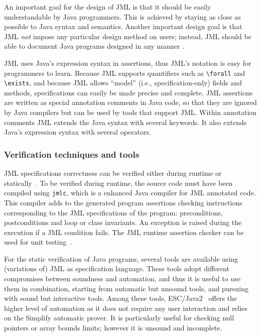 An important goal for the design of JML is that it should be easily
understandable by Java programmers. This is achieved by staying as
close as possible to Java syntax and semantics.  Another important
design goal is that JML {\em not} impose any particular design method
on users; instead, JML should be able to document Java programs
designed in any manner \cite{Leavens-Baker-Ruby03}.

JML uses Java's expression syntax in assertions,
thus JML's notation is easy for programmers to learn.  
Because JML supports quantifiers such as
\verb_\forall_ and \verb_\exists_, and because JML allows ``model''
(i.e., specification-only) fields and methods, specifications can
easily be made precise and complete.
JML assertions are written as special
annotation comments in Java code,
so that they are ignored by Java compilers but can be used
by tools that support JML\@.  Within annotation comments JML extends the
Java syntax with several keywords.  It also extends Java's expression syntax with several
operators.

\subsubsection{Verification techniques and tools}

JML specifications correctness can be verified either during runtime
or statically~\cite{BurdyCCEKLLP03}. To be verified during runtime, the
source code must have been compiled using \texttt{jmlc}, which is a
enhanced Java compiler for JML annotated code. This compiler adds to
the generated program assertions checking instructions corresponding
to the JML specifications of the program: preconditions, postconditions 
and loop or class invariants. An exception is raised during the execution 
if a JML condition fails. The JML runtime assertion checker can be used
for unit testing~\cite{CL02:ecoop}.


For the static verification of Java programs, several tools are
available using (variations of) JML as specification language. These
tools adopt different compromises between soundness and automation,
and thus it is useful to use them in combination, starting from
automatic but unsound tools, and pursuing with sound but interactive
tools.  Among these tools, ESC/Java2~\cite{CK04:cassis} offers the higher
level of automation as it does not require any user interaction and
relies on the Simplify automatic prover. It is particularly useful for
checking null pointers or array bounds limits; however it is unsound
and incomplete.

